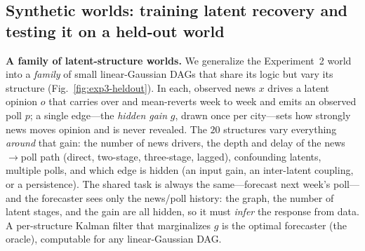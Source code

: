 \documentclass{article} %
\begin{document}
\subsection{Synthetic worlds: training latent recovery and testing it on a held-out world}
\label{sec:exp3-synthetic}

\textbf{A family of latent-structure worlds.}  We generalize the Experiment~2 world into a
\emph{family} of small linear-Gaussian DAGs that share its logic but vary its structure
(Fig.~\ref{fig:exp3-heldout}).  In each, observed news $x$ drives a latent opinion $o$ that carries over
and mean-reverts week to week and emits an observed poll $p$; a single
edge---the \emph{hidden gain} $g$, drawn once per city---sets how strongly news moves opinion and is
never revealed.  The $20$ structures vary everything \emph{around} that gain: the number of news
drivers, the depth and delay of the news$\to$poll path (direct, two-stage, three-stage, lagged),
confounding latents, multiple polls, and which edge is hidden (an input gain, an inter-latent coupling,
or a persistence).  The shared task is always the same---forecast next week's poll---and the forecaster
sees only the news/poll history: the graph, the number of latent stages, and the gain are all hidden,
so it must \emph{infer} the response from data.  A per-structure Kalman filter that marginalizes $g$ is
the optimal forecaster (the oracle), computable for any linear-Gaussian DAG.

\newcommand{\sll}[1]{\draw[per] (#1) to[out=158,in=202,looseness=5.2] (#1);} %
\newcommand{\slr}[1]{\draw[per] (#1) to[out=22,in=-22,looseness=5.2] (#1);}  %
\def\vs{1.08} %
\end{document}
